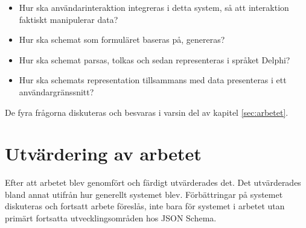 \begin{itemize}
	\item Hur ska användarinteraktion integreras i detta system, så att interaktion faktiskt manipulerar data?
	\item Hur ska schemat som formuläret baseras på, genereras?
	\item Hur ska schemat parsas, tolkas och sedan representeras i språket Delphi?
	\item Hur ska schemats representation tillsammans med data presenteras i ett användargränssnitt?
\end{itemize}

De fyra frågorna diskuteras och besvaras i varsin del av kapitel \ref{sec:arbetet}.

\section{Utvärdering av arbetet}
Efter att arbetet blev genomfört och färdigt utvärderades det. Det utvärderades bland annat utifrån hur generellt systemet blev. Förbättringar på systemet diskuteras och fortsatt arbete föreslås, inte bara för systemet i arbetet utan primärt fortsatta utvecklingsområden hos JSON Schema.